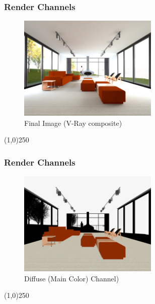 \begin{frame}
\frametitle{Render Channels}
\begin{figure}
	\centering
	\includegraphics[height=5cm]{./img/Rendering/SittingRoomFinal.png}
	\caption[Final Image (V-Ray composite)]{Final Image (V-Ray composite)}
	\label{fig:sittingroomfinalBeauty}
\end{figure}
\end{frame}
\begin{center}\line(1,0){250}\end{center}


\begin{frame}
\frametitle{Render Channels}
\begin{figure}
	\centering
	\includegraphics[height=5cm]{./img/Rendering/SittingRoomFinalDiffuse.png}
	\caption[Diffuse (Main Color) Channel)]{Diffuse (Main Color) Channel)}
	\label{fig:sittingroomfinalDiffuse}
\end{figure}
\end{frame}
\begin{center}\line(1,0){250}\end{center}



